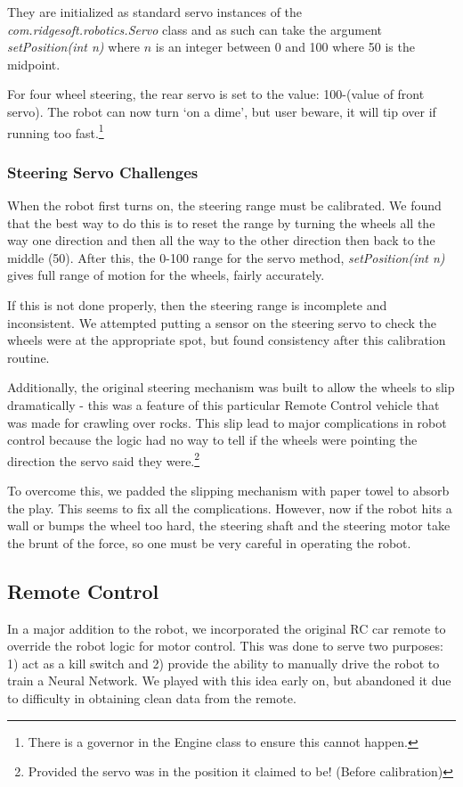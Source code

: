 \documentclass[12pt]{article}
\begin{document}
They are initialized as standard servo instances of the \textit{com.ridgesoft.robotics.Servo} class and as such can take the argument \textit{setPosition(int n)} where $n$ is an integer between 0 and 100 where 50 is the midpoint.

For four wheel steering, the rear servo is set to the value: 100-(value of front servo).  The robot can now turn `on a dime', but user beware, it will tip over if running too fast.\footnote{There is a governor in the Engine class to ensure this cannot happen.} 

\subsubsection*{Steering Servo Challenges}
When the robot first turns on, the steering range must be calibrated.  We found that the best way to do this is to reset the range by turning the wheels all the way one direction and then all the way to the other direction then back to the middle (50).  After this, the 0-100 range for the servo method, \textit{setPosition(int n)} gives full range of motion for the wheels, fairly accurately.

If this is not done properly, then the steering range is incomplete and inconsistent.  We attempted putting a sensor on the steering servo to check the wheels were at the appropriate spot, but found consistency after this calibration routine.
\vspace{2mm}

Additionally, the original steering mechanism was built to allow the wheels to slip dramatically - this was a feature of this particular Remote Control vehicle that was made for crawling over rocks.  This slip lead to major complications in robot control because the logic had no way to tell if the wheels were pointing the direction the servo said they were.\footnote{Provided the servo was in the position it claimed to be! (Before calibration)}

To overcome this, we padded the slipping mechanism with paper towel to absorb the play.  This seems to fix all the complications.  However, now if the robot hits a wall or bumps the wheel too hard, the steering shaft and the steering motor take the brunt of the force, so one must be very careful in operating the robot.


\clearpage
\subsection{Remote Control}
In a major addition to the robot, we incorporated the original RC car remote to override the robot logic for motor control.  This was done to serve two purposes: 1) act as a kill switch and 2) provide the ability to manually drive the robot to train a Neural Network.  We played with this idea early on, but abandoned it due to difficulty in obtaining clean data from the remote.
\end{document}

